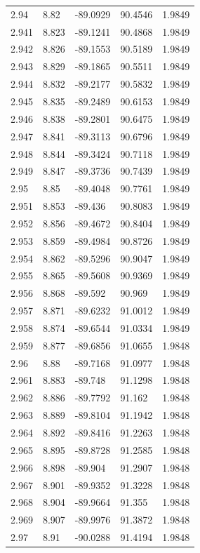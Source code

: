 \begin{tabular}{lllll}
2.94 & 8.82 & -89.0929 & 90.4546 & 1.9849 \\
2.941 & 8.823 & -89.1241 & 90.4868 & 1.9849 \\
2.942 & 8.826 & -89.1553 & 90.5189 & 1.9849 \\
2.943 & 8.829 & -89.1865 & 90.5511 & 1.9849 \\
2.944 & 8.832 & -89.2177 & 90.5832 & 1.9849 \\
2.945 & 8.835 & -89.2489 & 90.6153 & 1.9849 \\
2.946 & 8.838 & -89.2801 & 90.6475 & 1.9849 \\
2.947 & 8.841 & -89.3113 & 90.6796 & 1.9849 \\
2.948 & 8.844 & -89.3424 & 90.7118 & 1.9849 \\
2.949 & 8.847 & -89.3736 & 90.7439 & 1.9849 \\
2.95 & 8.85 & -89.4048 & 90.7761 & 1.9849 \\
2.951 & 8.853 & -89.436 & 90.8083 & 1.9849 \\
2.952 & 8.856 & -89.4672 & 90.8404 & 1.9849 \\
2.953 & 8.859 & -89.4984 & 90.8726 & 1.9849 \\
2.954 & 8.862 & -89.5296 & 90.9047 & 1.9849 \\
2.955 & 8.865 & -89.5608 & 90.9369 & 1.9849 \\
2.956 & 8.868 & -89.592 & 90.969 & 1.9849 \\
2.957 & 8.871 & -89.6232 & 91.0012 & 1.9849 \\
2.958 & 8.874 & -89.6544 & 91.0334 & 1.9849 \\
2.959 & 8.877 & -89.6856 & 91.0655 & 1.9848 \\
2.96 & 8.88 & -89.7168 & 91.0977 & 1.9848 \\
2.961 & 8.883 & -89.748 & 91.1298 & 1.9848 \\
2.962 & 8.886 & -89.7792 & 91.162 & 1.9848 \\
2.963 & 8.889 & -89.8104 & 91.1942 & 1.9848 \\
2.964 & 8.892 & -89.8416 & 91.2263 & 1.9848 \\
2.965 & 8.895 & -89.8728 & 91.2585 & 1.9848 \\
2.966 & 8.898 & -89.904 & 91.2907 & 1.9848 \\
2.967 & 8.901 & -89.9352 & 91.3228 & 1.9848 \\
2.968 & 8.904 & -89.9664 & 91.355 & 1.9848 \\
2.969 & 8.907 & -89.9976 & 91.3872 & 1.9848 \\
2.97 & 8.91 & -90.0288 & 91.4194 & 1.9848 \\

\end{tabular}
